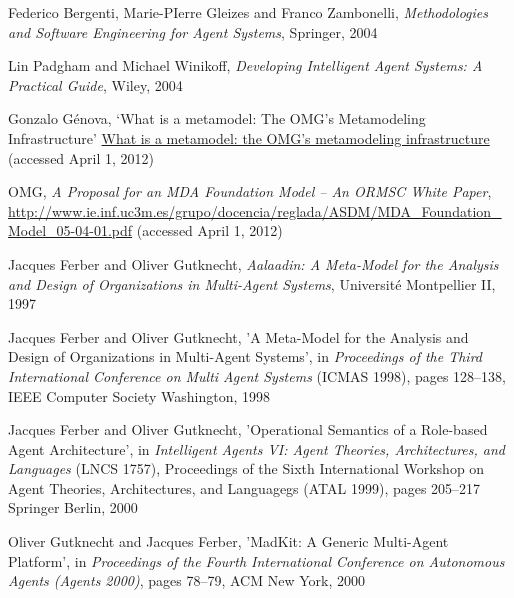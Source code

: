 \begin{thebibliography}{99}

Federico Bergenti, Marie-PIerre Gleizes and Franco Zambonelli,
\textit{Methodologies and Software Engineering for Agent Systems},
Springer, 2004

Lin Padgham and Michael Winikoff,
\textit{Developing Intelligent Agent Systems: A Practical Guide},
Wiley, 2004


Gonzalo Génova,
`What is a metamodel: The OMG’s Metamodeling Infrastructure'
\url{What is a metamodel: the OMG’s metamodeling infrastructure} (accessed April 1, 2012)

OMG,
\textit{A Proposal for an MDA Foundation Model -- An ORMSC White Paper},
\url{http://www.ie.inf.uc3m.es/grupo/docencia/reglada/ASDM/MDA_Foundation_Model_05-04-01.pdf} (accessed April 1, 2012)


Jacques Ferber and Oliver Gutknecht,
\textit{Aalaadin: A Meta-Model for the Analysis and Design of Organizations in Multi-Agent Systems},
Université Montpellier II, 1997

Jacques Ferber and Oliver Gutknecht,
'A Meta-Model for the Analysis and Design of Organizations in Multi-Agent Systems',
in \textit{Proceedings of the Third International Conference on Multi Agent Systems} (ICMAS 1998),
pages 128--138, 
IEEE Computer Society Washington, 1998

Jacques Ferber and Oliver Gutknecht,
'Operational Semantics of a Role-based Agent Architecture',
in \textit{Intelligent Agents VI: Agent Theories, Architectures, and Languages} (LNCS 1757),
Proceedings of the Sixth International Workshop on Agent Theories, Architectures, and Languagegs (ATAL 1999),
pages 205--217
Springer Berlin, 2000

Oliver Gutknecht and Jacques Ferber,
'MadKit: A Generic Multi-Agent Platform',
in \textit{Proceedings of the Fourth International Conference on Autonomous Agents (Agents 2000)},
pages 78--79,
ACM New York, 2000


\end{thebibliography}
